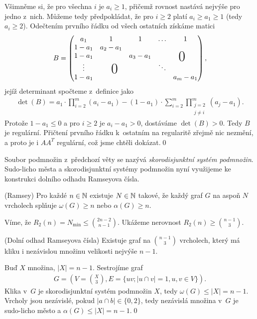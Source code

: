 Všimněme si, že pro všechna $i$ je $a_i\geq1$, přičemž rovnost nastává nejvýše pro jedno z~nich. Můžeme tedy předpokládat, že pro $i\geq2$ platí $a_i\geq a_1\geq1$ (tedy $a_i\geq2$). Odečtením prvního řádku od všech ostatních získáme matici
\renewcommand{\arraystretch}{1.2}
\begin{align}
	B=\left(\begin{matrix}
	a_1 & 1 &1&\hdots &1 \\
	1-a_1& a_2-a_1 &&&\smash{\raisebox{-10pt}{\bigzero}\quad} \\
	1-a_1&&a_3-a_1&&\\
	\vdots&&&\ddots&\\
	1-a_1&\smash{\quad\raisebox{15pt}{\bigzero}}&&&a_m-a_1
	\end{matrix}\right),
\end{align}
jejíž determinant spočteme z~definice jako
\begin{align}
  \det(B)=a_1\cdot\prod_{i=2}^m(a_i-a_1)-(1-a_1)\cdot\sum_{i=2}^m\prod_{\substack{j=2\\j\neq i}}^m(a_j-a_1).
\end{align}
Protože $1-a_1\leq0$ a pro $i\geq2$ je $a_i-a_1>0$, dostáváme $\det(B)>0$. Tedy $B$ je regulární. Přičtení prvního řádku k~ostatním na regularitě zřejmě nic nezmění, a proto je i $AA^T$ regulární, což jsme chtěli dokázat.\qed

\medskip
Soubor podmnožin z~předchozí věty se nazývá {\it skorodisjunktní systém podmnožin}. Sudo-licho města a skorodisjunktní systémy podmnožin nyní využijeme ke konstrukci dolního odhadu Ramseyova čísla.

\vt (Ramsey) Pro každé $n\in\mathbb{N}$ existuje $N\in\mathbb{N}$ takové, že každý graf $G$ na aspoň $N$ vrcholech splňuje $\omega(G)\geq n$ nebo $\alpha(G)\geq n$.

\medskip
Víme, že $R_2(n) = N_{\min} \leq\binom{2n-2}{n-1}$. Ukážeme nerovnost $R_2(n)\geq\binom{n-1}3$.

\vt (Dolní odhad Ramseyova čísla) Existuje graf na $\binom{n-1}3$ vrcholech, který má kliku i nezávislou množinu velikosti nejvýše $n-1$.

\dk Buď $X$ množina, $|X|=n-1$. Sestrojíme graf
\begin{align}
G=\left(V=\binom X3, E=\{uv; |u\cap v|=1, u,v\in V\}\right).
\end{align}
Klika v~$G$ je skorodisjunktní systém podmnožin $X$, tedy $\omega(G) \le |X| = n-1$. Vrcholy jsou nezávislé, pokud $|a\cap b| \in \{0,2\}$, tedy nezávislá množina v~$G$ je sudo-licho město a $\alpha(G) \le |X| = n-1$.\qed
